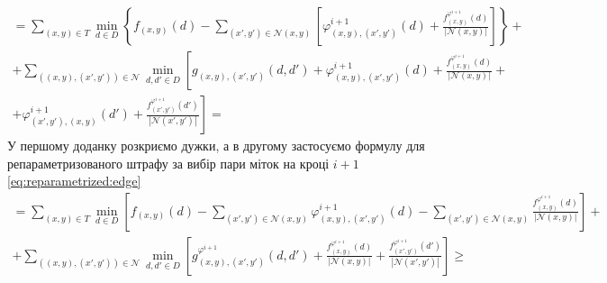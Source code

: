 \begin{equation*}
\begin{gathered}
    = \sum \limits_{\left(x, y \right) \in T}
        \min \limits_{d \in D} \left\{
            f_{ \left(x, y \right)} \left( d \right) -
            \sum \limits_{\left(x', y' \right) \in \mathcal{N}\left(x, y \right)}
            \left[
                \varphi_{\left(x, y \right), \left(x', y' \right)}^{i + 1}
                    \left( d \right) +
                \frac{f_{\left(x, y \right)}^{\varphi^{i + 1}} \left( d \right)}{\left| \mathcal{N} \left(x, y \right) \right|}
            \right]
        \right\} + \\
    + \sum \limits_{\left( \left(x, y \right), \left(x', y' \right) \right) \in \mathcal{N}}
        \min \limits_{d, d' \in D} \left[
            g_{\left(x, y \right), \left(x', y' \right)} \left( d, d' \right) +
            \varphi_{\left(x, y \right), \left(x', y' \right)}^{i + 1}
                \left( d \right) +
            \frac{f_{\left( x, y \right)}^{\varphi^{i + 1}} \left( d \right)}{\left| \mathcal{N}\left( x, y \right) \right|}
            + \right. \\
            \left. + \varphi_{\left(x', y' \right), \left(x, y \right)}^{i + 1}
                \left( d' \right) +
            \frac{f_{\left( x', y' \right)}^{\varphi^{i + 1}} \left( d' \right)}{\left| \mathcal{N}\left( x', y' \right) \right|}
        \right] =
\end{gathered}
\end{equation*}
У першому доданку розкриємо дужки,
а в другому застосуємо формулу для репараметризованого штрафу за вибір пари
міток на кроці $i + 1$
\eqref{eq:reparametrized:edge}
\begin{equation*}
\begin{gathered}
    = \sum \limits_{\left(x, y \right) \in T}
        \min \limits_{d \in D} \left[
            f_{\left(x, y \right)} \left( d \right) -
            \sum \limits_{\left(x' ,y' \right) \in \mathcal{N}\left( x, y \right)}
                \varphi_{\left(x, y \right), \left(x', y' \right)}^{i + 1}
                    \left( d \right) -
            \sum \limits_{\left(x', y' \right) \in \mathcal{N}\left( x, y \right)}
                \frac{f_{\left( x, y \right)}^{\varphi^{i + 1}}\left( d \right)}{\left|\mathcal{N}\left(x, y \right) \right|}
        \right] + \\
    + \sum \limits_{\left( \left(x, y \right), \left(x', y' \right) \right) \in \mathcal{N}}
        \min \limits_{d, d' \in D} \left[
            g_{\left(x, y \right), \left(x', y' \right)}^{\varphi^{i + 1}}
                \left( d, d'\right) +
            \frac{f_{\left(x, y \right)}^{\varphi^{i + 1}}\left( d \right)}{\left| \mathcal{N}\left(x, y \right) \right|} +
            \frac{f_{\left(x', y' \right)}^{\varphi^{i + 1}}\left( d' \right)}{\left| \mathcal{N}\left(x', y' \right) \right|}
        \right] \ge
\end{gathered}
\end{equation*}
